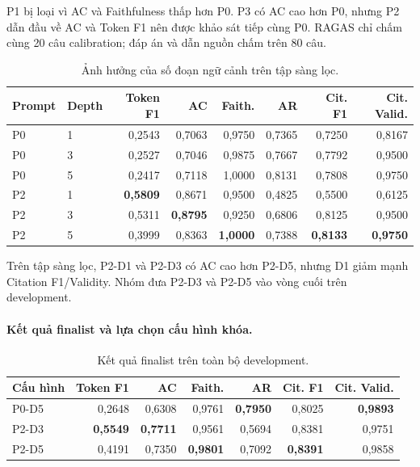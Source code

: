 P1 bị loại vì AC và Faithfulness thấp hơn P0. P3 có AC cao hơn P0, nhưng P2 dẫn đầu về AC và Token F1 nên được khảo sát tiếp cùng P0. RAGAS chỉ chấm cùng 20 câu calibration; đáp án và dẫn nguồn chấm trên 80 câu.
\begin{table}[H]
  \centering
  \caption{Ảnh hưởng của số đoạn ngữ cảnh trên tập sàng lọc.}
  \label{tab:phase2-depth-screening}
  \small
  \begin{tabular}{llrrrrrr}
    \toprule
    \textbf{Prompt} & \textbf{Depth} & \textbf{Token F1} & \textbf{AC} &
    \textbf{Faith.} & \textbf{AR} & \textbf{Cit. F1} & \textbf{Cit. Valid.} \\
    \midrule
    P0 & 1 & 0,2543 & 0,7063 & 0,9750 & 0,7365 & 0,7250 & 0,8167 \\
    P0 & 3 & 0,2527 & 0,7046 & 0,9875 & 0,7667 & 0,7792 & 0,9500 \\
    P0 & 5 & 0,2417 & 0,7118 & 1,0000 & 0,8131 & 0,7808 & 0,9750 \\
    \midrule
    P2 & 1 & \textbf{0,5809} & 0,8671 & 0,9500 & 0,4825 & 0,5500 & 0,6125 \\
    P2 & 3 & 0,5311 & \textbf{0,8795} & 0,9250 & 0,6806 & 0,8125 & 0,9500 \\
    P2 & 5 & 0,3999 & 0,8363 & \textbf{1,0000} & 0,7388 & \textbf{0,8133} & \textbf{0,9750} \\
    \bottomrule
  \end{tabular}
\end{table}

Trên tập sàng lọc, P2-D1 và P2-D3 có AC cao hơn P2-D5, nhưng D1 giảm mạnh Citation F1/Validity. Nhóm đưa P2-D3 và P2-D5 vào vòng cuối trên development.

\paragraph{Kết quả finalist và lựa chọn cấu hình khóa.}
\begin{table}[H]
  \centering
  \caption{Kết quả finalist trên toàn bộ development.}
  \label{tab:phase2-zero-shot-finalists}
  \small
  \begin{tabular}{lrrrrrr}
    \toprule
    \textbf{Cấu hình} & \textbf{Token F1} & \textbf{AC} & \textbf{Faith.} &
    \textbf{AR} & \textbf{Cit. F1} & \textbf{Cit. Valid.} \\
    \midrule
    P0-D5 & 0,2648 & 0,6308 & 0,9761 & \textbf{0,7950} & 0,8025 & \textbf{0,9893} \\
    P2-D3 & \textbf{0,5549} & \textbf{0,7711} & 0,9561 & 0,5694 & 0,8381 & 0,9751 \\
    P2-D5 & 0,4191 & 0,7350 & \textbf{0,9801} & 0,7092 & \textbf{0,8391} & 0,9858 \\
    \bottomrule
  \end{tabular}
\end{table}

